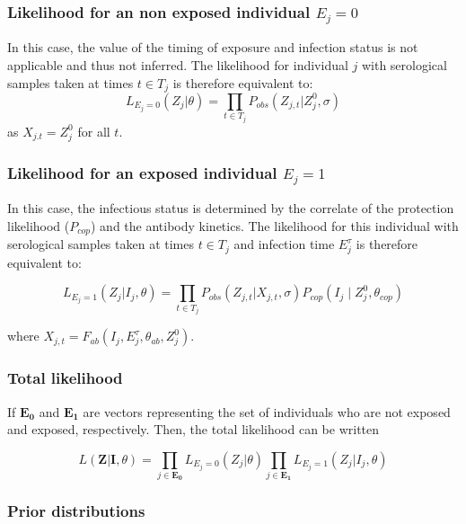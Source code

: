 \subsubsection{Likelihood for an non exposed individual $E_j = 0$} 
In this case, the value of the timing of exposure and infection status is not applicable and thus not inferred. The likelihood for individual $j$ with serological samples taken at times $t\in T_j$ is therefore equivalent to:
\begin{equation}
\label{ll:1E0}
L_{E_j = 0}(Z_{j}| \theta) = \prod_{t \in T_j}P_{obs}(Z_{j,t}|Z^0_{j}, \sigma)
\end{equation}
as $X_{j.t} = Z^0_{j}$ for all $t$.


\subsubsection{Likelihood for an exposed individual $E_j = 1$}
In this case, the infectious status is determined by the correlate of the protection likelihood ($P_{cop}$) and the antibody kinetics. The likelihood for this individual with serological samples taken at times $t\in T_j$ and infection time $E^\tau_j$ is therefore equivalent to:

\begin{equation}
\label{ll:1E1}
L_{E_j = 1}(Z_{j}| I_j, \theta) = \prod_{t \in T_j}P_{obs}(Z_{j,t}| X_{j,t}, \sigma)P_{cop}(I_j \mid Z_{j}^0, \theta_{cop})
\end{equation}

where $X_{j,t} = F_{ab}( I_j,  E_j^\tau, \theta_{ab}, Z^0_j)$.


\subsubsection{Total likelihood}

If $\mathbf{E_0}$ and $\mathbf{E_1}$ are vectors representing the set of individuals who are not exposed and exposed, respectively. Then, the total likelihood can be written 

\begin{equation}
L(\mathbf{Z} | \mathbf{I}, \theta) = \prod_{j \in \mathbf{E_0}}L_{E_j = 0}(Z_{j}| \theta) \prod_{j \in \mathbf{E_1}}L_{E_j = 1}(Z_{j}| I_j, \theta) 
\end{equation}


\subsubsection{Prior distributions}

